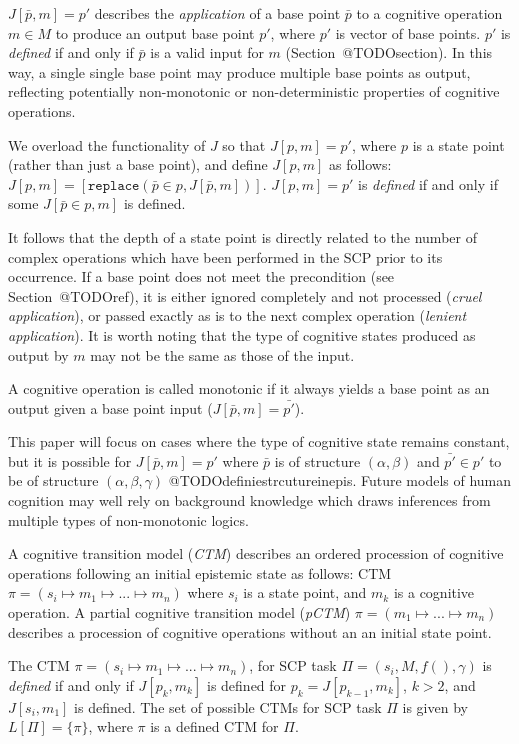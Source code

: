 $J[\bar{p},m]=p'$ describes the \textit{application} of a base point $\bar{p}$ to a cognitive operation $m \in M$ to produce an output base point $p'$, where $p'$ is vector of base points. $p'$ is \textit{defined} if and only if $\bar{p}$ is a valid input for $m$ (Section~@TODOsection). In this way, a single single base point may produce multiple base points as output, reflecting potentially non-monotonic or non-deterministic properties of cognitive operations. 

We overload the functionality of $J$ so that $J[p,m]=p'$, where $p$ is a state point (rather than just a base point), and define $J[p,m]$ as follows: $J[p,m]=[ \texttt{replace}(\bar{p} \in p,J[\bar{p},m])]$. $J[p,m]=p'$ is \textit{defined} if and only if some $J[\bar{p} \in p,m]$ is defined.

It follows that the depth of a state point is directly related to the number of complex operations which have been performed in the SCP prior to its occurrence. If a base point does not meet the precondition (see Section~@TODOref), it is either ignored completely and not processed (\textit{cruel application}), or passed exactly as is to the next complex operation (\textit{lenient application}). It is worth noting that the type of cognitive states produced as output by $m$ may not be the same as those of the input.
 
A cognitive operation is called monotonic if it always yields a base point as an output given a base point input ($J[\bar{p},m]=\bar{p'}$).

This paper will focus on cases where the type of cognitive state remains constant, but it is possible for $J[\bar{p},m]=p'$ where $\bar{p}$ is of structure $(\alpha,\beta)$ and $\bar{p'}\in p'$ to be of structure $(\alpha,\beta,\gamma)$ @TODOdefiniestrcutureinepis. Future models of human cognition may well rely on background knowledge which draws inferences from multiple types of non-monotonic logics.

A cognitive transition model (\textit{CTM}) describes an ordered procession of cognitive operations following an initial epistemic state as follows: CTM $\pi=(s_i\longmapsto m_1\longmapsto ...\longmapsto m_n)$ where $s_i$ is a state point, and $m_k$ is a cognitive operation. A partial cognitive transition model (\textit{pCTM}) $\pi=(m_1\longmapsto ...\longmapsto m_n)$ describes a procession of cognitive operations without an an initial state point.

The CTM $\pi = (s_i\longmapsto m_1 \longmapsto ...\longmapsto m_n)$, for SCP task $\Pi=(s_i, M, f(), \gamma)$ is \textit{defined} if and only if $J[p_k,m_k]$ is defined for $p_k = J[p_{k-1},m_k]$, $k>2$, and $J[s_i,m_1]$ is defined. The set of possible CTMs for SCP task $\Pi$ is given by $L[\Pi]=\{\pi\}$, where $\pi$ is a defined CTM for $\Pi$.

